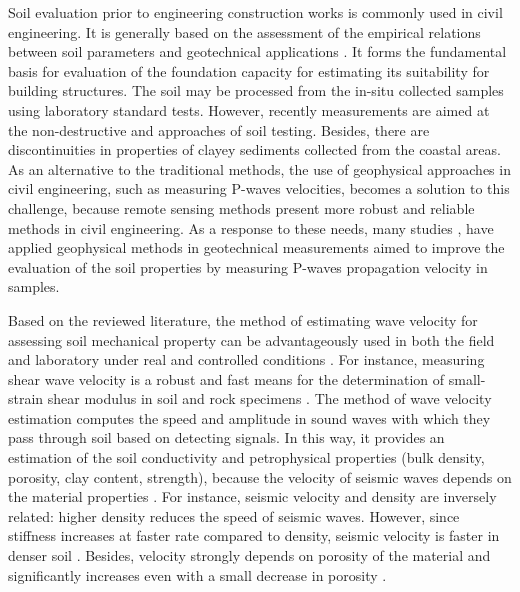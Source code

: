 \documentclass[10pt,twoside,twocolumn,a4paper]{article}
\begin{document}
Soil evaluation prior to engineering construction works  is commonly used in civil engineering. It is generally based on the assessment of the empirical relations between soil parameters and geotechnical applications \cite{BrunarskiDohojda,CzarneckiGemert,Kallenetal2016}. It forms the fundamental basis for evaluation of the foundation capacity for estimating its suitability for building structures. The soil may be processed from the in-situ collected samples using laboratory standard tests. However, recently measurements are aimed at the non-destructive and approaches of soil testing. Besides, there are discontinuities in properties of clayey sediments collected from the coastal areas. As an alternative to the traditional methods, the use of geophysical approaches in civil engineering, such as measuring P-waves velocities, becomes a solution to this challenge, because remote sensing methods present more robust and reliable methods in civil engineering. As a response to these needs, many studies \cite{Frattaetal2005,Zhaoetal2022,Zhangetal2021,Guetal2021,Weietal2022}, have applied geophysical methods in geotechnical measurements aimed to improve the evaluation of the soil properties by measuring P-waves propagation velocity in samples.

Based on the reviewed literature, the method of estimating wave velocity for assessing soil mechanical property can be advantageously used in both the field and laboratory under real and controlled conditions \cite{Hussien}. For instance, measuring shear wave velocity is a robust and fast means for the determination of small-strain shear modulus in soil and rock specimens \cite{Leong}. The method of wave velocity estimation computes the speed and amplitude in sound waves with which they pass through soil based on detecting signals. In this way, it provides an estimation of the soil conductivity and petrophysical properties (bulk density, porosity, clay content, strength), because the velocity of seismic waves depends on the material properties \cite{ElSayed}. For instance, seismic velocity and density are inversely related: higher density reduces the speed of seismic waves. However, since stiffness increases at faster rate compared to density, seismic velocity is faster in denser soil \cite{Shietal2010}. Besides, velocity strongly depends on porosity of the material and significantly increases even with a small decrease in porosity \cite{Foti}. 
\end{document}
